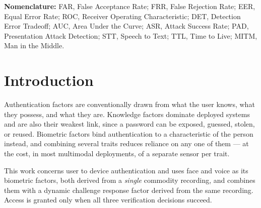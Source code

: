 \documentclass[runningheads]{llncs}
\begin{document}
\noindent\textbf{Nomenclature:} FAR, False Acceptance Rate; FRR, False Rejection Rate; EER, Equal Error Rate; ROC, Receiver Operating Characteristic; DET, Detection Error Tradeoff; AUC, Area Under the Curve; ASR, Attack Success Rate; PAD, Presentation Attack Detection; STT, Speech to Text; TTL, Time to Live; MITM, Man in the Middle.

\section {Introduction}

Authentication factors are conventionally drawn from what the user knows, what
they possess, and what they are. Knowledge factors dominate deployed systems and
are also their weakest link, since a password can be exposed, guessed, stolen, or
reused. Biometric factors bind authentication to a characteristic of the person
instead, and combining several traits reduces reliance on any one of them --- at
the cost, in most multimodal deployments, of a separate sensor per trait.

This work concerns user to device authentication and uses face and voice as its
biometric factors, both derived from a \emph{single} commodity recording, and
combines them with a dynamic challenge response factor derived from the same
recording. Access is granted only when all three verification decisions succeed.
\end{document}

